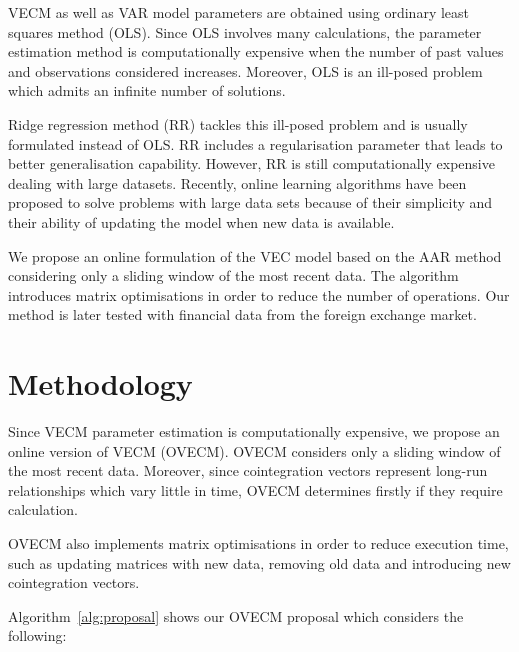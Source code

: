 VECM as well as VAR model parameters are obtained using ordinary least squares
method (OLS). Since OLS involves many calculations, the parameter estimation
method is computationally expensive when the number of past values and
observations considered increases. Moreover, OLS is an ill-posed problem which
admits an infinite number of solutions. 

Ridge regression method (RR) tackles this ill-posed problem and is usually
formulated instead of OLS. RR includes a regularisation parameter that leads to
better generalisation capability. However, RR is still computationally
expensive dealing with large datasets. Recently, online learning algorithms
have been proposed to solve problems with large data sets because of their
simplicity and their ability of updating the model when new data is available. 

We propose an online formulation of the VEC model based on the
AAR method considering only a sliding window of the most recent data. The
algorithm introduces matrix optimisations in order to reduce the number of
operations. Our method is later tested with financial data from the foreign
exchange market.


\section{Methodology} \label{sec:methodology}

Since VECM parameter estimation is computationally expensive, we propose an
online version of VECM (OVECM).  OVECM considers only a sliding window of the
most recent data. Moreover, since cointegration vectors represent long-run
relationships which vary little in time, OVECM determines firstly if they require calculation. 

OVECM also implements matrix optimisations in order to reduce execution time,
such as updating matrices with new data, removing old data and introducing new
cointegration vectors.

Algorithm~\ref{alg:proposal} shows our OVECM proposal which considers the
following:

